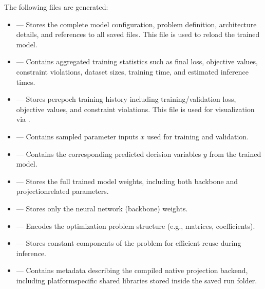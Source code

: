 \documentclass[letterpaper,10pt,english,openany,oneside]{sphinxmanual}
\begin{document}
\sphinxAtStartPar
The following files are generated:
\begin{itemize}
\item {} 
\sphinxAtStartPar
{} — Stores the complete model configuration, problem definition, architecture details, and references to all saved files. This file is used to reload the trained model.

\item {} 
\sphinxAtStartPar
{} — Contains aggregated training statistics such as final loss, objective values, constraint violations, dataset sizes, training time, and estimated inference times.

\item {} 
\sphinxAtStartPar
{} — Stores per\sphinxhyphen{}epoch training history including training/validation loss, objective values, and constraint violations. This file is used for visualization via .

\item {} 
\sphinxAtStartPar
{} — Contains sampled parameter inputs \(x\) used for training and validation.

\item {} 
\sphinxAtStartPar
{} — Contains the corresponding predicted decision variables \(y\) from the trained model.

\item {} 
\sphinxAtStartPar
{} — Stores the full trained model weights, including both backbone and projection\sphinxhyphen{}related parameters.

\item {} 
\sphinxAtStartPar
{} — Stores only the neural network (backbone) weights.

\item {} 
\sphinxAtStartPar
{} — Encodes the optimization problem structure (e.g., matrices, coefficients).

\item {} 
\sphinxAtStartPar
{} — Stores constant components of the problem for efficient reuse during inference.

\item {} 
\sphinxAtStartPar
{} — Contains metadata describing the compiled native projection backend, including platform\sphinxhyphen{}specific shared libraries stored inside the saved run folder.

\end{itemize}
\end{document}
